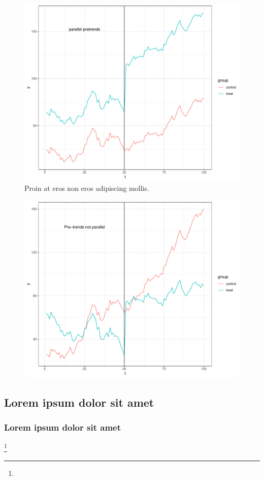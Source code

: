 \begin{figure}[H]
    \centering
        \includegraphics[width = \textwidth]{figures/fig1}
        \caption[Lorem Ipsum]{Proin at eros non eros adipiscing mollis.
    \label{fig:figura1}}
\end{figure}

\lipsum[3]

\begin{figure}[H]
    \centering 
        \includegraphics[width = \textwidth]{figures/fig2}
        \caption[Lorem Ipsum]{\lipsum[4]
    \label{fig:figura2}}
\end{figure}


\lipsum[5]

\subsection{Lorem ipsum dolor sit amet}

\lipsum[6]

\subsubsection{Lorem ipsum dolor sit amet}

\lipsum[7]\footnote{\lipsum[8]}